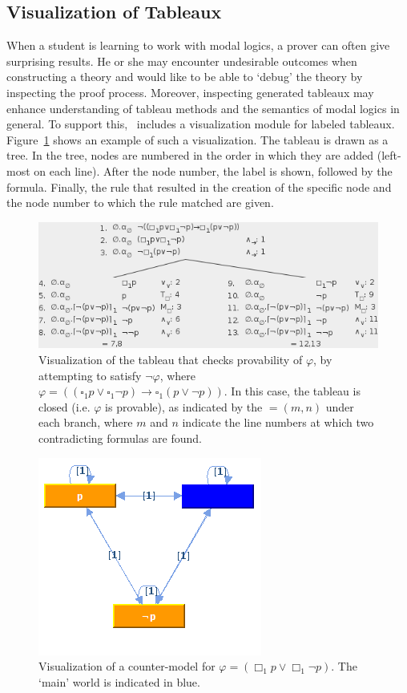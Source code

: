 \subsection{Visualization of Tableaux}

When a student is learning to work with modal logics, a prover can often give surprising
results. He or she may encounter undesirable outcomes when constructing a
theory and would like to be able to `debug' the theory by inspecting the proof
process. Moreover, inspecting generated tableaux may enhance understanding of
tableau methods and the semantics of modal logics in general.
To support this, \oops\ includes a visualization module for labeled tableaux.
Figure~\ref{fig:tableauVis} shows an example of such a visualization. 
The tableau is drawn as a tree.
In the tree, nodes are numbered  in the order in which they are added
(left-most on each line).
After the node number, the
label is shown, followed by the formula. Finally, the rule that resulted in
the creation of the specific node and the node number to which the rule
matched are given.

\begin{figure}
\centering
\includegraphics[scale=.50]{images/tableauVis}
\caption{Visualization of the tableau that checks provability of $\varphi$, by
attempting to satisfy $\neg \varphi$, where
$\varphi = ((\square_1 p \vee \square_1 \neg p) \to \square_1(p \vee \neg p))$.
In this case, the tableau is closed (i.e. $\varphi$ is provable), as indicated
by the $= (m, n)$ under each branch, where $m$ and $n$ indicate the line
numbers at which two contradicting formulas are found.}
\label{fig:tableauVis}
\end{figure}

\begin{figure}[b]
\centering
\includegraphics[scale=.50]{images/modelVis}
\caption{Visualization of a counter-model for $\varphi = (\Box_1 p \vee \Box_1
\neg p)$. The `main' world is indicated in blue.}
\label{fig:modelVis}
\end{figure}

